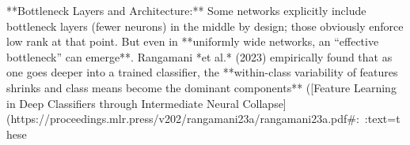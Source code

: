 **Bottleneck Layers and Architecture:** Some networks explicitly include bottleneck layers (fewer neurons) in the middle by design; those obviously enforce low rank at that point. But even in **uniformly wide networks, an “effective bottleneck” can emerge**. Rangamani *et al.* (2023) empirically found that as one goes deeper into a trained classifier, the **within-class variability of features shrinks and class means become the dominant components** ([Feature Learning in Deep Classifiers through Intermediate Neural Collapse](https://proceedings.mlr.press/v202/rangamani23a/rangamani23a.pdf#:~:text=these%

